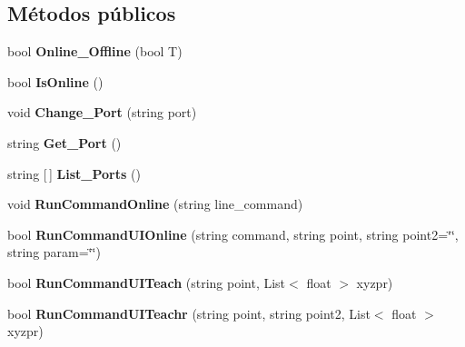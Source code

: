 \subsection*{Métodos públicos}
\begin{DoxyCompactItemize}
\item 
\mbox{\label{class_controller_adf43cf5f8f242a3d831f3162aef0d705}} 
bool {\bfseries Online\+\_\+\+Offline} (bool T)
\item 
\mbox{\label{class_controller_afc8517ea3abd9acb92173b55342b320a}} 
bool {\bfseries Is\+Online} ()
\item 
\mbox{\label{class_controller_a9d890757158c307d9e9d1915b03b5928}} 
void {\bfseries Change\+\_\+\+Port} (string port)
\item 
\mbox{\label{class_controller_a8a4b22a9b00f39da6e6c2dc063066460}} 
string {\bfseries Get\+\_\+\+Port} ()
\item 
\mbox{\label{class_controller_a7cd4400bd0fe69494c14002b6b2fa649}} 
string \mbox{[}$\,$\mbox{]} {\bfseries List\+\_\+\+Ports} ()
\item 
\mbox{\label{class_controller_a92811ce0f1bce922136d254730a1be8f}} 
void {\bfseries Run\+Command\+Online} (string line\+\_\+command)
\item 
\mbox{\label{class_controller_ae08a706bf80dc97741a7eb65a3ece6d3}} 
bool {\bfseries Run\+Command\+U\+I\+Online} (string command, string point, string point2=\char`\"{}\char`\"{}, string param=\char`\"{}\char`\"{})
\item 
\mbox{\label{class_controller_abeae24ba81e6f83fd3c2502981143212}} 
bool {\bfseries Run\+Command\+U\+I\+Teach} (string point, List$<$ float $>$ xyzpr)
\item 
\mbox{\label{class_controller_a62cb3a2673bf180265a2965bdd3e4cb3}} 
bool {\bfseries Run\+Command\+U\+I\+Teachr} (string point, string point2, List$<$ float $>$ xyzpr)
\item 
\mbox{\label{class_controller_a5a7b660e3aebb0220e923c28ede75bc6}} 

\end{DoxyCompactItemize}
